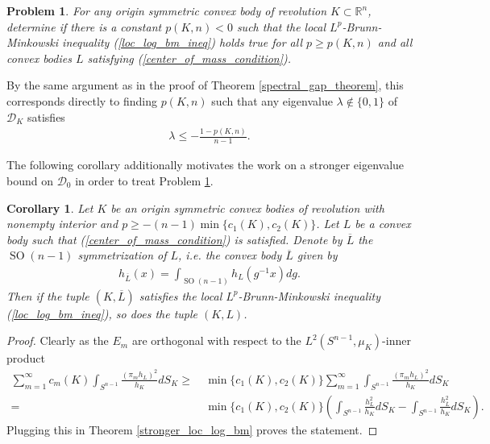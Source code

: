 \documentclass[12pt,twoside]{amsart}
\numberwithin{satz}{section}
\newtheorem{cor}[satz]{Corollary}
\newtheorem{problem}[satz]{Problem}
\theoremstyle{definition}
\numberwithin{equation}{section}
\newcommand\R{\mathbb{R}}
\newcommand\SO{\operatorname{SO}}
\begin{document}
	\begin{problem}\label{local_lp_bm_problem_p<0}
		For any origin symmetric convex body of revolution $K\subset\R^n$, determine if there is a constant $p(K,n)<0$ such that the local $L^p$-Brunn-Minkowski inequality (\ref{loc_log_bm_ineq}) holds true for all $p\geq p(K,n)$ and all convex bodies $L$ satisfying (\ref{center_of_mass_condition}).
	\end{problem}
	
	By the same argument as in the proof of Theorem \ref{spectral_gap_theorem}, this corresponds directly to finding $p(K,n)$ such that any eigenvalue $\lambda\notin\{0,1\}$ of $\mathcal{D}_K$ satisfies  
	\begin{align*}
		\lambda\leq - \frac{1-p(K,n)}{n-1}.
	\end{align*}
	
	The following corollary additionally motivates the work on a stronger eigenvalue bound on $\mathcal{D}_0$ in order to treat Problem \ref{local_lp_bm_problem_p<0}.
		
	\begin{cor}
		Let $K$ be an origin symmetric convex bodies of revolution with nonempty interior and $p\geq -(n-1)\min\{c_1(K),c_2(K)\}$. Let $L$ be a convex body such that (\ref{center_of_mass_condition}) is satisfied. Denote by $\overline{L}$ the $\SO(n-1)$ symmetrization of $L$, i.e. the convex body $\overline{L}$ given by
		\begin{align*}
			h_{\overline{L}}(x)=\int_{\SO(n-1)}h_L(g^{-1}x)dg.
		\end{align*}
		Then if the tuple $(K,\overline{L})$ satisfies the local $L^p$-Brunn-Minkowski inequality (\ref{loc_log_bm_ineq}), so does the tuple $(K,L)$.
	\end{cor}

	\begin{proof}
		Clearly as the $E_m$ are orthogonal with respect to the $L^2(S^{n-1},\mu_K)$-inner product
		\begin{align*}
			\sum_{m=1}^\infty c_m(K) \int_{S^{n-1}} \frac{(\pi_mh_L)^2}{h_K}dS_K\geq  & \ \min\{c_1(K),c_2(K)\}\sum_{m=1}^\infty  \int_{S^{n-1}} \frac{(\pi_mh_L)^2}{h_K}dS_K \\
			=& \ \min\{c_1(K),c_2(K)\}\left(\int_{S^{n-1}} \frac{h_L^2}{h_K}dS_K - \int_{S^{n-1}} \frac{h_{\overline{L}}^2}{h_K}dS_K\right). 
		\end{align*}
		Plugging this in Theorem \ref{stronger_loc_log_bm} proves the statement.
	\end{proof}
	
\end{document}
